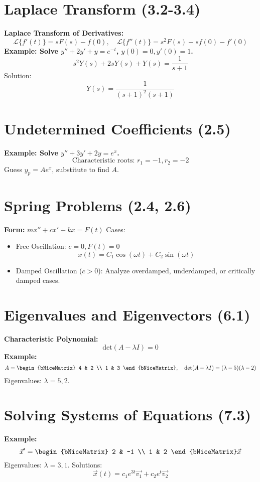 \documentclass[10pt]{article}
\begin{document}
\begin{multicols}{2}
\section*{Laplace Transform (3.2-3.4)}
\textbf{Laplace Transform of Derivatives:}
\[
\mathcal{L}\{f'(t)\} = sF(s) - f(0), \quad \mathcal{L}\{f''(t)\} = s^2F(s) - sf(0) - f'(0)
\]
\textbf{Example: Solve \( y'' + 2y' + y = e^{-t} \), \( y(0) = 0, y'(0) = 1 \).}  
\[
s^2Y(s) + 2sY(s) + Y(s) = \frac{1}{s+1}
\]
Solution:
\[
Y(s) = \frac{1}{(s+1)^2(s+1)}
\]

\section*{Undetermined Coefficients (2.5)}
\textbf{Example: Solve \( y'' + 3y' + 2y = e^x \).}  
\[
\text{Characteristic roots: } r_1 = -1, r_2 = -2
\]
Guess \( y_p = Ae^x \), substitute to find \( A \).

\section*{Spring Problems (2.4, 2.6)}
\textbf{Form:} \( mx'' + cx' + kx = F(t) \)  
Cases:
\begin{itemize}
    \item Free Oscillation: \( c = 0, F(t) = 0 \)
    \[
    x(t) = C_1\cos(\omega t) + C_2\sin(\omega t)
    \]
    \item Damped Oscillation (\( c > 0 \)): Analyze overdamped, underdamped, or critically damped cases.
\end{itemize}

\section*{Eigenvalues and Eigenvectors (6.1)}
\textbf{Characteristic Polynomial:}
\[
\text{det}(A - \lambda I) = 0
\]
\textbf{Example:}
\[
A = \begin{bNiceMatrix}
4 & 2 \\ 
1 & 3
\end{bNiceMatrix}, \quad \text{det}(A - \lambda I) = (\lambda - 5)(\lambda - 2)
\]
Eigenvalues: \( \lambda = 5, 2 \).

\section*{Solving Systems of Equations (7.3)}
\textbf{Example:}
\[
\vec{x}' = \begin{bNiceMatrix}
2 & -1 \\ 
1 & 2
\end{bNiceMatrix} \vec{x}
\]
Eigenvalues: \( \lambda = 3, 1 \).  
Solutions:
\[
\vec{x}(t) = c_1e^{3t}\vec{v_1} + c_2e^{t}\vec{v_2}
\]

\end{multicols}
\end{document}
